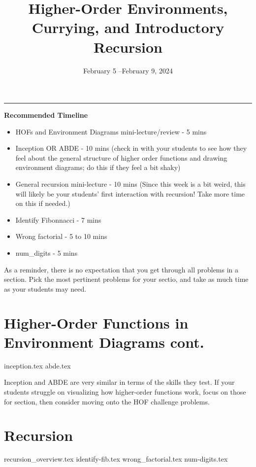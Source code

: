 \documentclass{exam}
\title{Higher-Order Environments, Currying, and Introductory Recursion}
\date{February 5 --February 9, 2024}
\begin{document}
\maketitle
\rule{\textwidth}{0.15em}
\fontsize{12}{15}\selectfont

\begin{meta}
\textbf{Recommended Timeline}
\begin{itemize}
    \item HOFs and Environment Diagrams mini-lecture/review - 5 mins
    \item Inception OR ABDE - 10 mins (check in with your students to see how they feel about the general structure of higher order functions and drawing environment diagrams; do this if they feel a bit shaky)
    \item General recursion mini-lecture - 10 mins (Since this week is a bit weird, this will likely be your students' first interaction with recursion! Take more time on this if needed.)
    \item Identify Fibonnacci - 7 mins
    \item Wrong factorial - 5 to 10 mins
    \item num\_digits - 5 mins
\end{itemize}
As a reminder, there is no expectation that you get through all problems in a section. Pick the most pertinent problems for your sectio, and take as much time as your students may need. 
\end{meta}

\begin{questions}
    \section{Higher-Order Functions in Environment Diagrams cont.}
    {inception.tex}
    {abde.tex}
    \begin{questionmeta}
        Inception and ABDE are very similar in terms of the skills they test. If your students struggle on visualizing how higher-order functions work, focus on those for section, then consider moving onto the HOF challenge problems.
    \end{questionmeta}

    \section{Recursion}
    {recursion_overview.tex}
    {identify-fib.tex}
    {wrong_factorial.tex}
    {num-digits.tex}
\end{questions}
\end{document}
